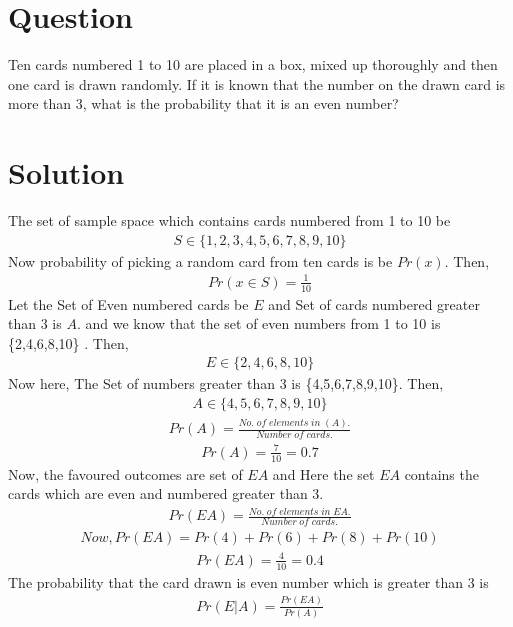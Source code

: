 \documentclass[journal,12pt,twocolumn]{IEEEtran}
\begin{document}
\section*{Question}
Ten cards numbered 1 to 10 are placed in
a box, mixed up thoroughly and then one
card is drawn randomly. If it is known that
the number on the drawn card is more than
3, what is the probability that it is an even
number?
\section*{Solution}
The set of sample space which contains cards numbered from 1 to 10 be 
\begin{align}
S \in \{1,2,3,4,5,6,7,8,9,10\}
\end{align}
Now probability of picking a random card from ten cards is be $Pr(x)$. Then,
\begin{align}
Pr(x\in S )=\frac{1}{10}
\end{align}
Let the Set of Even numbered cards be $E$ and Set of cards numbered greater than 3 is $A$.
and we know that the set of even numbers from 1 to 10 is \{2,4,6,8,10\} . Then,
\begin{align}
E \in \{2,4,6,8,10\}    
\end{align}
Now here, The Set of numbers greater than 3 
is \{4,5,6,7,8,9,10\}. Then,
\begin{align}
    A \in \{4,5,6,7,8,9,10\}
\end{align}
\begin{align}
    Pr(A)=\frac{No.\; of\; elements\; in\; (A).}{Number\; of\; cards.}
\end{align}
\begin{align}
\label{eq1}
    Pr(A)=\frac{7}{10}=0.7
\end{align}
Now, the favoured outcomes are set of $EA$ and 
Here the set $EA$ contains the cards which are even and numbered greater than 3.
\begin{align}
    Pr(EA)=\frac{No.\; of\; elements\; in\; E A.}{Number\; of\;cards.}
\end{align}
\begin{align}
   Now , Pr(EA) = Pr(4)+Pr(6)+Pr(8)+Pr(10)
\end{align}
\begin{align}
\label{eq2}
     Pr(EA) =\frac{4}{10}=0.4 
\end{align}
The probability that the card drawn is even number which is greater than 3 is
\begin{align}
    Pr(E|A)=\frac{Pr(EA)}{Pr(A)}
\end{align}
\end{document}
